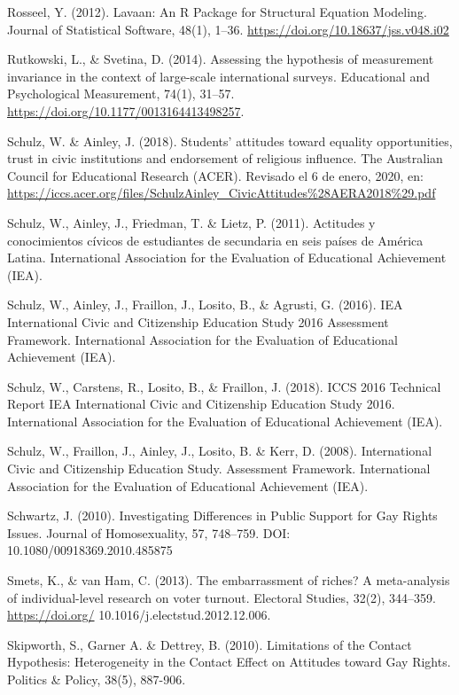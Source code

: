 \documentclass[12pt,twoside]{templates/facsothesis}
\begin{document}
Rosseel, Y. (2012). Lavaan: An R Package for Structural Equation Modeling. Journal of Statistical Software, 48(1), 1--36. \url{https://doi.org/10.18637/jss.v048.i02}

Rutkowski, L., \& Svetina, D. (2014). Assessing the hypothesis of measurement invariance in the context of large-scale international surveys. Educational and Psychological Measurement, 74(1), 31--57. \url{https://doi.org/10.1177/0013164413498257}.

Schulz, W. \& Ainley, J. (2018). Students' attitudes toward equality opportunities, trust in civic institutions and endorsement of religious influence. The Australian Council for Educational Research (ACER). Revisado el 6 de enero, 2020, en: \url{https://iccs.acer.org/files/SchulzAinley_CivicAttitudes\%28AERA2018\%29.pdf}

Schulz, W., Ainley, J., Friedman, T. \& Lietz, P. (2011). Actitudes y conocimientos cívicos de estudiantes de secundaria en seis países de América Latina. International Association for the Evaluation of Educational Achievement (IEA).

Schulz, W., Ainley, J., Fraillon, J., Losito, B., \& Agrusti, G. (2016). IEA International Civic and Citizenship Education Study 2016 Assessment Framework. International Association for the Evaluation of Educational Achievement (IEA).

Schulz, W., Carstens, R., Losito, B., \& Fraillon, J. (2018). ICCS 2016 Technical Report IEA International Civic and Citizenship Education Study 2016. International Association for the Evaluation of Educational Achievement (IEA).

Schulz, W., Fraillon, J., Ainley, J., Losito, B. \& Kerr, D. (2008). International Civic and Citizenship Education Study. Assessment Framework. International Association for the Evaluation of Educational Achievement (IEA).

Schwartz, J. (2010). Investigating Differences in Public Support for Gay Rights Issues. Journal of Homosexuality, 57, 748--759. DOI: 10.1080/00918369.2010.485875

Smets, K., \& van Ham, C. (2013). The embarrassment of riches? A meta-analysis of individual-level research on voter turnout. Electoral Studies, 32(2), 344--359. \url{https://doi.org/} 10.1016/j.electstud.2012.12.006.

Skipworth, S., Garner A. \& Dettrey, B. (2010). Limitations of the Contact Hypothesis: Heterogeneity in the Contact Effect on Attitudes toward Gay Rights. Politics \& Policy, 38(5), 887-906.
\end{document}
